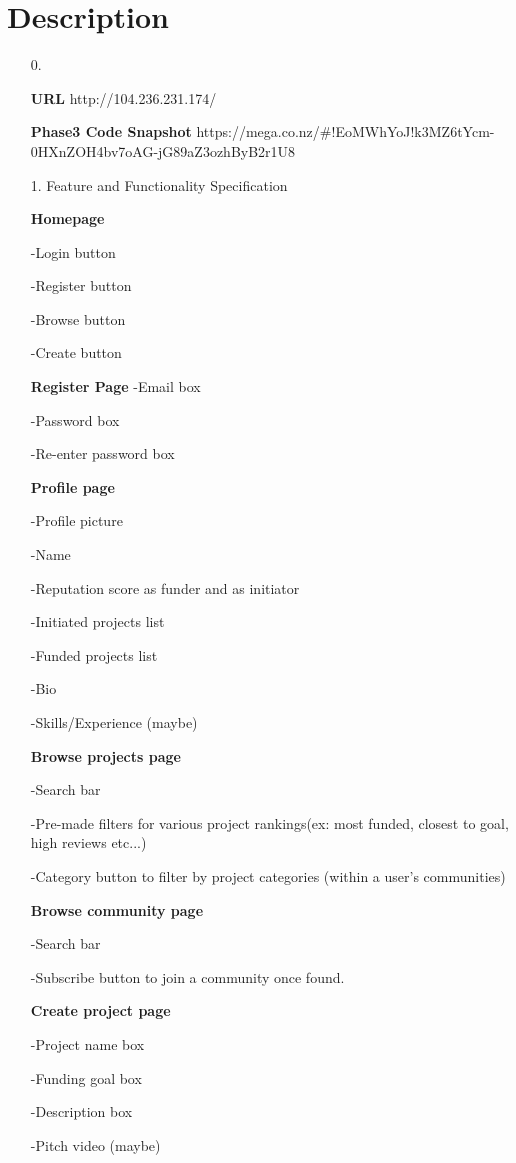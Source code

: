 \documentclass[12pt]{article}
\begin{document}
\section*{Description}
\begin{enumerate}

\item[0.]

\textbf{URL}
http://104.236.231.174/

\textbf{Phase3 Code Snapshot}
https://mega.co.nz/#!EoMWhYoJ!k3MZ6tYcm-0HXnZOH4bv7oAG-jG89aZ3ozhByB2r1U8

\item[1.] Feature and Functionality Specification

\textbf{Homepage}

-Login button

-Register button

-Browse button

-Create button

\textbf{Register Page}
-Email box

-Password box

-Re-enter password box

\textbf{Profile page}

-Profile picture

-Name

-Reputation score as funder and as initiator

-Initiated projects list

-Funded projects list

-Bio

-Skills/Experience (maybe)

\textbf{Browse projects page}

-Search bar

-Pre-made filters for various project rankings(ex: most funded, closest to goal, high reviews etc...)

-Category button to filter by project categories (within a user's communities)

\textbf{Browse community page}

-Search bar

-Subscribe button to join a community once found.

\textbf{Create project page}

-Project name box

-Funding goal box

-Description box

-Pitch video (maybe)


\end{enumerate}
\end{document}
